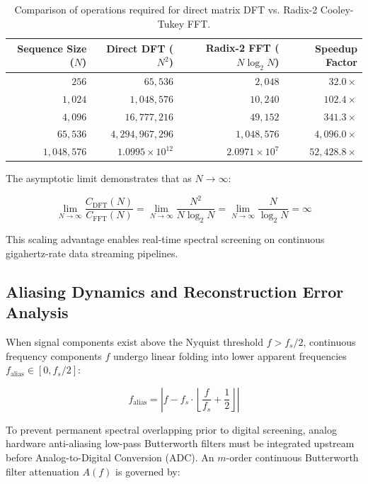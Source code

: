 \documentclass[11pt,a4paper]{article}
\begin{document}
\begin{table}[h!]
\centering
\caption{Comparison of operations required for direct matrix DFT vs. Radix-2 Cooley-Tukey FFT.}
\label{tab:complexity}
\vspace{0.2cm}
\begin{tabular}{r r r r}
\toprule
\textbf{Sequence Size ($N$)} & \textbf{Direct DFT ($N^2$)} & \textbf{Radix-2 FFT ($N \log_2 N$)} & \textbf{Speedup Factor} \\
\midrule
$256$       & $65,536$             & $2,048$            & $32.0 \times$ \\
$1,024$     & $1,048,576$          & $10,240$           & $102.4 \times$ \\
$4,096$     & $16,777,216$         & $49,152$           & $341.3 \times$ \\
$65,536$    & $4,294,967,296$      & $1,048,576$        & $4,096.0 \times$ \\
$1,048,576$ & $1.0995 \times 10^{12}$ & $2.0971 \times 10^{7}$ & $52,428.8 \times$ \\
\bottomrule
\end{tabular}
\end{table}

The asymptotic limit demonstrates that as $N \to \infty$:

\begin{equation}
\lim_{N \to \infty} \frac{C_{\text{DFT}}(N)}{C_{\text{FFT}}(N)} = \lim_{N \to \infty} \frac{N^2}{N \log_2 N} = \lim_{N \to \infty} \frac{N}{\log_2 N} = \infty
\end{equation}

This scaling advantage enables real-time spectral screening on continuous gigahertz-rate data streaming pipelines.

\subsection{Aliasing Dynamics and Reconstruction Error Analysis}

When signal components exist above the Nyquist threshold $f > f_s/2$, continuous frequency components $f$ undergo linear folding into lower apparent frequencies $f_{\text{alias}} \in [0, f_s/2]$:

\begin{equation}
f_{\text{alias}} = \left| f - f_s \cdot \left\lfloor \frac{f}{f_s} + \frac{1}{2} \right\rfloor \right|
\end{equation}

To prevent permanent spectral overlapping prior to digital screening, analog hardware anti-aliasing low-pass Butterworth filters must be integrated upstream before Analog-to-Digital Conversion (ADC). An $m$-order continuous Butterworth filter attenuation $A(f)$ is governed by:
\end{document}
